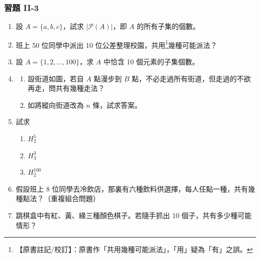 \subsubsection*{習題 II-3}\label{sec:b5s-ex2-3}

\begin{enumerate}[label=\textbf{\arabic*.}]
  \item 設 $A = \{a, b, c\}$，試求 $|\mathscr{P}(A)|$，即 $A$ 的所有子集的個數。
  \item 班上 50 位同學中派出 10 位公差整理校園，共用\label{note:b5s-ch2-p83-gongyong}\footnote{【原書註記/校訂】：原書作「共用幾種可能派法」，「用」疑為「有」之誤。}幾種可能派法？
  \item 設 $A = \{1, 2, \ldots, 100\}$，求 $A$ 中恰含 10 個元素的子集個數。
  \item
  \begin{minipage}[t]{0.64\linewidth}
  \begin{enumerate}[label=(\arabic*)]
    \item 設街道如圖，若自 $A$ 點漫步到 $B$ 點，不必走過所有街道，但走過的不欲再走，問共有幾種走法？
    \item 如將縱向街道改為 $n$ 條，試求答案。
  \end{enumerate}
  \end{minipage}\hfill
  \begin{minipage}[t]{0.32\linewidth}
  \centering
  \vspace{0pt}
  \end{minipage}
  \item 試求
  \begin{enumerate}[label=(\arabic*)]
    \item $H_2^5$
    \item $H_3^3$
    \item $H_2^{100}$
  \end{enumerate}
  \item 假設班上 8 位同學去冷飲店，那裏有六種飲料供選擇，每人任點一種，共有幾種點法？（重複組合問題）
  \item 跳棋盒中有紅、黃、綠三種顏色棋子。若隨手抓出 10 個子，共有多少種可能情形？

\end{enumerate}
